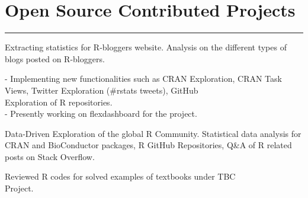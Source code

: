 \documentclass[]{meetresume-class}
\begin{document}
\begin{minipage}[t]{0.66\textwidth}
		\section{Open Source Contributed Projects} 
		\noindent\rule{12.5cm}{0.4pt}
		 
		\descript{}
		\noindent
		\hspace{5em}%
		\begin{minipage}{0.85\textwidth\vspace{2pt}}
			Extracting statistics for R-bloggers website. Analysis on the different types of blogs posted on R-bloggers.
		\end{minipage}
		\sectionsep
		
		 
		\descript{}
		\noindent
		\hspace{5em}%
		\begin{minipage}{0.85\textwidth\vspace{2pt}}
			 - Implementing new functionalities such as CRAN Exploration, CRAN Task Views, Twitter Exploration (\#rstats tweets), GitHub \\Exploration of R repositories.\\
			 - Presently working on flexdashboard for the project.
		\end{minipage}
		\sectionsep
		
		 
		\descript{}
		\noindent
		\hspace{5em}%
		\begin{minipage}{0.85\textwidth\vspace{2pt}}
			Data-Driven Exploration of the global R Community. Statistical data analysis for
			CRAN and BioConductor packages, R GitHub Repositories, Q\&A of R related
			posts on Stack Overflow.
		\end{minipage}
		\sectionsep
		
		 
		\noindent
		\hspace{5em}%
		\begin{minipage}{0.85\textwidth\vspace{2pt}}
			Reviewed R codes for solved examples of textbooks under TBC \\Project. 
		\end{minipage}
		\sectionsep

\end{minipage}
\end{document}
